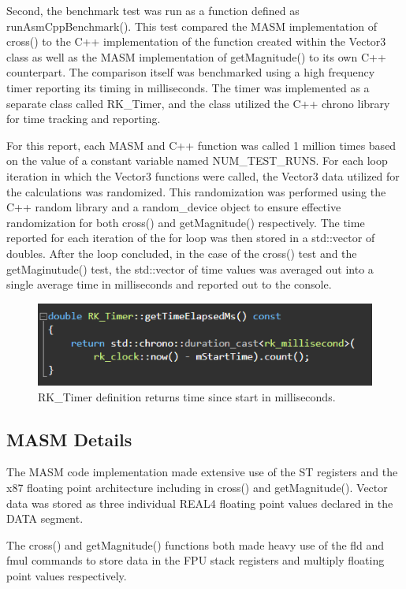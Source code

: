 \documentclass[12pt]{article}
\begin{document}
\noindent Second, the benchmark test was run as a function defined as runAsmCppBenchmark(). This test compared the MASM implementation of cross() to the C++ implementation of the function created within the Vector3 class as well as the MASM implementation of getMagnitude() to its own C++ counterpart. The comparison itself was benchmarked using a high frequency timer reporting its timing in milliseconds. The timer was implemented as a separate class called RK\_Timer, and the class utilized the C++ chrono library for time tracking and reporting. 

For this report, each MASM and C++ function was called 1 million times based on the value of a constant variable named NUM\_TEST\_RUNS. For each loop iteration in which the Vector3 functions were called, the Vector3 data utilized for the calculations was randomized. This randomization was performed using the C++ random library and a random\_device object to ensure effective randomization for both cross() and getMagnitude() respectively. The time reported for each iteration of the for loop was then stored in a std::vector of doubles. After the loop concluded, in the case of the cross() test and the getMaginutude() test, the std::vector of time values was averaged out into a single average time in milliseconds and reported out to the console.

\begin{figure}[!htb]
  \centering
  \includegraphics[scale=0.75]{img/time_func.PNG}
  \caption{RK\_Timer definition returns time since start in milliseconds.}
  \label{fig:time_func}
\end{figure}

\subsection{MASM Details}
The MASM code implementation made extensive use of the ST registers and the x87 floating point architecture including in cross() and getMagnitude(). Vector data was stored as three individual REAL4 floating point values declared in the DATA segment. 

The cross() and getMagnitude() functions both made heavy use of the fld and fmul commands to store data in the FPU stack registers and multiply floating point values respectively. 
\end{document}
